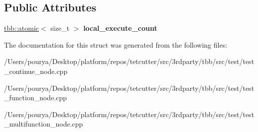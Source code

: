 \subsection*{Public Attributes}
\begin{DoxyCompactItemize}
\item 
\hypertarget{structinc__functor_a3faa7ad2bce856938bb47cdfd6e8b387}{}\hyperlink{structtbb_1_1atomic}{tbb\+::atomic}$<$ size\+\_\+t $>$ {\bfseries local\+\_\+execute\+\_\+count}\label{structinc__functor_a3faa7ad2bce856938bb47cdfd6e8b387}

\end{DoxyCompactItemize}


The documentation for this struct was generated from the following files\+:\begin{DoxyCompactItemize}
\item 
/\+Users/pourya/\+Desktop/platform/repos/tetcutter/src/3rdparty/tbb/src/test/test\+\_\+continue\+\_\+node.\+cpp\item 
/\+Users/pourya/\+Desktop/platform/repos/tetcutter/src/3rdparty/tbb/src/test/test\+\_\+function\+\_\+node.\+cpp\item 
/\+Users/pourya/\+Desktop/platform/repos/tetcutter/src/3rdparty/tbb/src/test/test\+\_\+multifunction\+\_\+node.\+cpp\end{DoxyCompactItemize}
